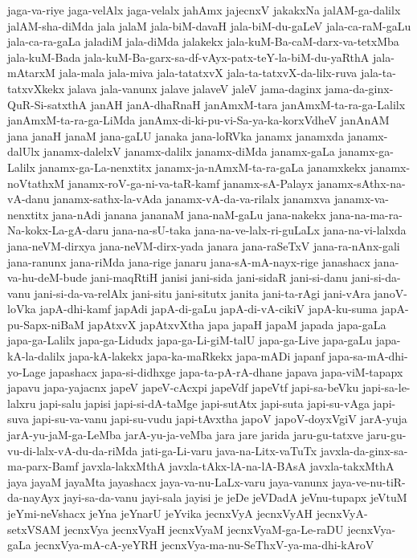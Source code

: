 {jaga-va-riye
jaga-velAlx
jaga-velalx
jahAmx
jajecnxV
jakakxNa
jalAM-ga-dalilx
jalAM-sha-diMda
jala
jalaM
jala-biM-davaH
jala-biM-du-gaLeV
jala-ca-raM-gaLu
jala-ca-ra-gaLa
jaladiM
jala-diMda
jalakekx
jala-kuM-Ba-caM-darx-va-tetxMba
jala-kuM-Bada
jala-kuM-Ba-garx-sa-df-vAyx-patx-teY-la-biM-du-yaRthA
jala-mAtarxM
jala-mala
jala-miva
jala-tatatxvX
jala-ta-tatxvX-da-lilx-ruva
jala-ta-tatxvXkekx
jalava
jala-vanunx
jalave
jalaveV
jaleV
jama-daginx
jama-da-ginx-QuR-Si-satxthA
janAH
janA-dhaRnaH
janAmxM-tara
janAmxM-ta-ra-ga-Lalilx
janAmxM-ta-ra-ga-LiMda
janAmx-di-ki-pu-vi-Sa-ya-ka-korxVdheV
janAnAM
jana
janaH
janaM
jana-gaLU
janaka
jana-loRVka
janamx
janamxda
janamx-dalUlx
janamx-dalelxV
janamx-dalilx
janamx-diMda
janamx-gaLa
janamx-ga-Lalilx
janamx-ga-La-nenxtitx
janamx-ja-nAmxM-ta-ra-gaLa
janamxkekx
janamx-noVtathxM
janamx-roV-ga-ni-va-taR-kamf
janamx-sA-Palayx
janamx-sAthx-na-vA-danu
janamx-sathx-la-vAda
janamx-vA-da-va-rilalx
janamxva
janamx-va-nenxtitx
jana-nAdi
janana
jananaM
jana-naM-gaLu
jana-nakekx
jana-na-ma-ra-Na-kokx-La-gA-daru
jana-na-sU-taka
jana-na-ve-lalx-ri-guLaLx
jana-na-vi-lalxda
jana-neVM-dirxya
jana-neVM-dirx-yada
janara
jana-raSeTxV
jana-ra-nAnx-gali
jana-ranunx
jana-riMda
jana-rige
janaru
jana-sA-mA-nayx-rige
janashacx
jana-va-hu-deM-bude
jani-maqRtiH
janisi
jani-sida
jani-sidaR
jani-si-danu
jani-si-da-vanu
jani-si-da-va-relAlx
jani-situ
jani-situtx
janita
jani-ta-rAgi
jani-vAra
janoV-loVka
japA-dhi-kamf
japAdi
japA-di-gaLu
japA-di-vA-cikiV
japA-ku-suma
japA-pu-Sapx-niBaM
japAtxvX
japAtxvXtha
japa
japaH
japaM
japada
japa-gaLa
japa-ga-Lalilx
japa-ga-Lidudx
japa-ga-Li-giM-talU
japa-ga-Live
japa-gaLu
japa-kA-la-dalilx
japa-kA-lakekx
japa-ka-maRkekx
japa-mADi
japanf
japa-sa-mA-dhi-yo-Lage
japashacx
japa-si-didhxge
japa-ta-pA-rA-dhane
japava
japa-viM-tapapx
japavu
japa-yajacnx
japeV
japeV-cAcxpi
japeVdf
japeVtf
japi-sa-beVku
japi-sa-le-lalxru
japi-salu
japisi
japi-si-dA-taMge
japi-sutAtx
japi-suta
japi-su-vAga
japi-suva
japi-su-va-vanu
japi-su-vudu
japi-tAvxtha
japoV
japoV-doyxVgiV
jarA-yuja
jarA-yu-jaM-ga-LeMba
jarA-yu-ja-veMba
jara
jare
jarida
jaru-gu-tatxve
jaru-gu-vu-di-lalx-vA-du-da-riMda
jati-ga-Li-varu
java-na-Litx-vaTuTx
javxla-da-ginx-sa-ma-parx-Bamf
javxla-lakxMthA
javxla-tAkx-lA-na-lA-BAsA
javxla-takxMthA
jaya
jayaM
jayaMta
jayashacx
jaya-va-nu-LaLx-varu
jaya-vanunx
jaya-ve-nu-tiR-da-nayAyx
jayi-sa-da-vanu
jayi-sala
jayisi
je
jeDe
jeVDadA
jeVnu-tupapx
jeVtuM
jeYmi-neVshacx
jeYna
jeYnarU
jeYvika
jecnxVyA
jecnxVyAH
jecnxVyA-setxVSAM
jecnxVya
jecnxVyaH
jecnxVyaM
jecnxVyaM-ga-Le-raDU
jecnxVya-gaLa
jecnxVya-mA-cA-yeYRH
jecnxVya-ma-nu-SeThxV-ya-ma-dhi-kAroV
}
